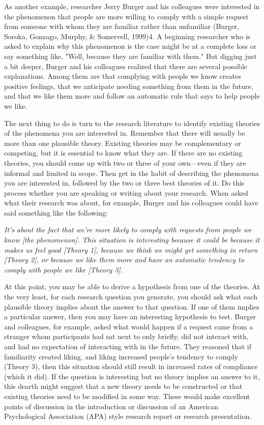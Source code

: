 As another example, researcher Jerry Burger and his colleagues were interested in the phenomenon that people are more willing to comply with a simple request from someone with whom they are familiar rather than unfamiliar (Burger, Soroka, Gonzago, Murphy, \& Somervell, 1999)4. A beginning researcher who is asked to explain why this phenomenon is the case might be at a complete loss or say something like, "Well, because they are familiar with them." But digging just a bit deeper, Burger and his colleagues realized that there are several
possible explanations. Among them are that complying with people we know creates positive feelings, that we anticipate needing something from them in the future, and that we like them more and follow an automatic rule that says to help people we like.

The next thing to do is turn to the research literature to identify existing theories of the phenomena you are interested in. Remember that there will usually be more than one plausible theory. Existing theories may be complementary or competing, but it is essential to know what they are. If there are no existing theories, you should come up with two or three of your own---even if they are informal and limited in scope. Then get in the habit of describing the phenomena you are interested in, followed by the two or three best theories of it. Do this process whether you are speaking or writing about your research. When asked what their research was about, for example, Burger and his colleagues could have said something like the following:

\emph{It's about the fact that we're more likely to comply with requests from people we know [the phenomenon]. This situation is interesting because it could be because it makes us feel good [Theory 1], because we think we might get something in return [Theory 2], or because we like them more and have an automatic tendency to comply with people we like [Theory 3].}

At this point, you may be able to derive a hypothesis from one of the theories. At the very least, for each research question you generate, you should ask what each plausible theory implies about the answer to that question. If one of them implies a particular answer, then you may have an interesting hypothesis to test. Burger and colleagues, for example, asked what would happen if a request came from a stranger whom participants had sat next to only briefly, did not interact with, and had no expectation of interacting with in the future. They reasoned that if familiarity created liking, and liking increased people's tendency to comply (Theory 3), then this situation should still result in increased rates of compliance (which it did). If the question is interesting but no theory implies an answer to it, this dearth might suggest that a new theory needs to be constructed or that existing theories need to be modified in some way. These would make excellent points of discussion in the introduction or discussion of an American Psychological Association (APA) style research report or research presentation.

